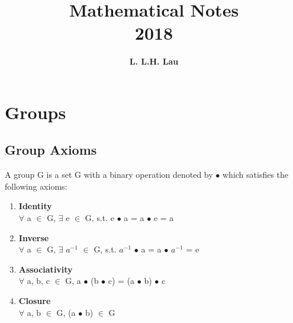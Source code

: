 \documentclass{report}
\title{\fontsize{40}{48} \selectfont \textbf{Mathematical Notes \\  2018}}
\author{\textbf{L. L.H. Lau}}
\date{}
\begin{document}
\maketitle
\chapter*{Groups}
\vspace{10.0mm}
\section*{Group Axioms}
\large{ A group G is a set G with a binary operation denoted by $\bullet$  which satisfies the following axioms:\\ 
\begin{enumerate}
	\item \textbf{Identity}\\
		\linebreak
		$\forall$ a $\in$ G, $\exists$ e $\in$ G, s.t. e $\bullet$ a = a $\bullet$ e = a   
	\item \textbf{Inverse}\\
		\linebreak
		 $\forall$ a $\in$ G, $\exists$ $a^{-1}$ $\in$ G, s.t. $a^{-1}$ $ \bullet$ a = a $\bullet$ $a^{-1}$ = e
	\item \textbf{Associativity}\\
		\linebreak
		$\forall$ a, b, c $\in$ G, a $\bullet$ (b $\bullet$ c) = (a $\bullet$ b) $\bullet$ c
	\item \textbf{Closure}\\
		\linebreak
		$\forall$ a, b $\in$ G, (a $\bullet$ b) $\in$ G	
\end{enumerate}


}
\end{document}

